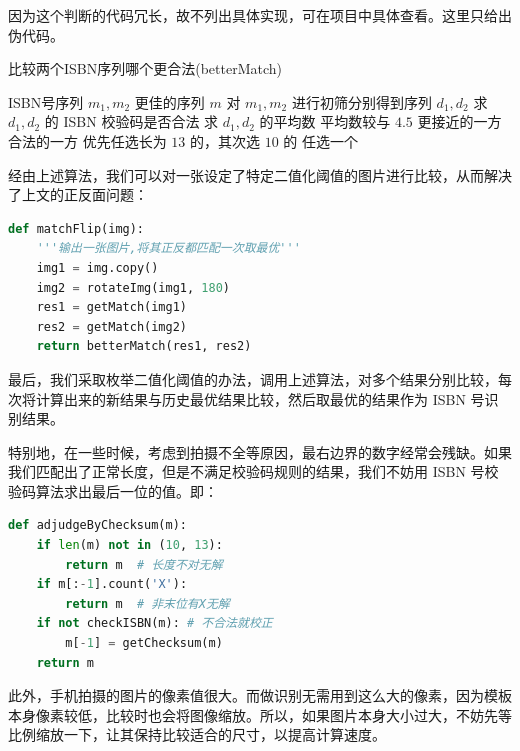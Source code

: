 \documentclass{ctexart}
\begin{document}
因为这个判断的代码冗长，故不列出具体实现，可在项目中具体查看。这里只给出伪代码。
\begin{algorithm}
    \caption{比较两个ISBN序列哪个更合法(betterMatch)}
    \label{betterMatch}
    \renewcommand{\algorithmicrequire}{\textbf{输入:}}
    \renewcommand{\algorithmicensure}{\textbf{输出:}}
    \begin{algorithmic}
        \REQUIRE ISBN号序列 $m_1,m_2$
        \ENSURE 更佳的序列 $m$
        \STATE 对 $m_1,m_2$ 进行初筛分别得到序列 $d_1,d_2$
        \STATE 求 $d_1,d_2$ 的 ISBN 校验码是否合法
        \STATE 求 $d_1,d_2$ 的平均数
        \RETURN 平均数较与 $4.5$ 更接近的一方
        \ELSE
            \RETURN 合法的一方
            \ELSE
                \RETURN 优先任选长为 $13$ 的，其次选 $10$ 的
                \ELSE
                \RETURN 任选一个
                \ENDIF
            \ENDIF
        \ENDIF
    \end{algorithmic}
\end{algorithm}

经由上述算法，我们可以对一张设定了特定二值化阈值的图片进行比较，从而解决了上文的正反面问题：

\begin{lstlisting}[language=python]
def matchFlip(img):
    '''输出一张图片,将其正反都匹配一次取最优'''
    img1 = img.copy()
    img2 = rotateImg(img1, 180)
    res1 = getMatch(img1)
    res2 = getMatch(img2)
    return betterMatch(res1, res2)
\end{lstlisting}

最后，我们采取枚举二值化阈值的办法，调用上述算法，对多个结果分别比较，每次将计算出来的新结果与历史最优结果比较，然后取最优的结果作为 ISBN 号识别结果。

特别地，在一些时候，考虑到拍摄不全等原因，最右边界的数字经常会残缺。如果我们匹配出了正常长度，但是不满足校验码规则的结果，我们不妨用 ISBN 号校验码算法求出最后一位的值。即：

\begin{lstlisting}[language=python]
def adjudgeByChecksum(m):
    if len(m) not in (10, 13):
        return m  # 长度不对无解
    if m[:-1].count('X'):
        return m  # 非末位有X无解
    if not checkISBN(m): # 不合法就校正
        m[-1] = getChecksum(m)
    return m 
\end{lstlisting}

此外，手机拍摄的图片的像素值很大。而做识别无需用到这么大的像素，因为模板本身像素较低，比较时也会将图像缩放。所以，如果图片本身大小过大，不妨先等比例缩放一下，让其保持比较适合的尺寸，以提高计算速度。
\end{document}
